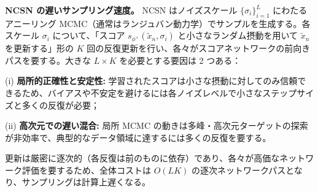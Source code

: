 \textbf{NCSN の遅いサンプリング速度。} NCSN はノイズスケール $\{\sigma_i\}_{i=1}^L$ にわたるアニーリング MCMC（通常はランジュバン動力学）でサンプルを生成する。各スケール $\sigma_i$ について、「スコア $s_{\phi^\times}(\tilde{x}_n,\sigma_i)$ と小さなランダム摂動を用いて $\tilde{x}_n$ を更新する」形の $K$ 回の反復更新を行い、各々がスコアネットワークの前向きパスを要する。大きな $L\times K$ を必要とする要因は 2 つある：

(i) \textbf{局所的正確性と安定性:} 学習されたスコアは小さな摂動に対してのみ信頼できるため、バイアスや不安定を避けるには各ノイズレベルで小さなステップサイズと多くの反復が必要；

(ii) \textbf{高次元での遅い混合:} 局所 MCMC の動きは多峰・高次元ターゲットの探索が非効率で、典型的なデータ領域に達するには多くの反復を要する。

更新は厳密に逐次的（各反復は前のものに依存）であり、各々が高価なネットワーク評価を要するため、全体コストは $O(LK)$ の逐次ネットワークパスとなり、サンプリングは計算上遅くなる。

